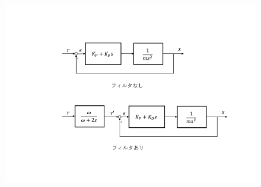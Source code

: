 \documentclass[11pt]{article} %
\begin{document}
\begin{figure}[t]                                                                       
  \begin{center}                                                                        
    \includegraphics[width=1.0\columnwidth]{image.pdf}                        
  \end{center}                                                                          
  \caption{\label{figure:system}}          
\end{figure}
\end{document}
